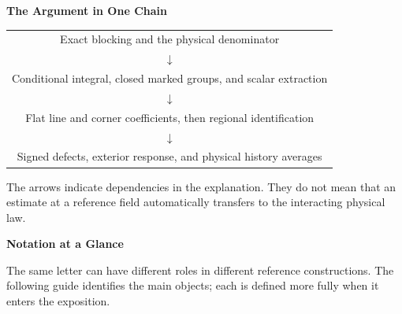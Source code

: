 \documentclass[11pt,a4paper]{article}
\newcommand{\subhead}[1]{\par\vspace{4pt}\textbf{\color{ink}#1}\par}
\begin{document}
\vspace{10pt}
\subhead{The Argument in One Chain}
\begin{center}
    \begin{tabular}{c}
        Exact blocking and the physical denominator\\
        $\downarrow$\\
        Conditional integral, closed marked groups, and scalar extraction\\
        $\downarrow$\\
        Flat line and corner coefficients, then regional identification\\
        $\downarrow$\\
        Signed defects, exterior response, and physical history averages
    \end{tabular}
\end{center}
The arrows indicate dependencies in the explanation. They do not mean that an estimate at a reference field automatically transfers to the interacting physical law.

\clearpage
{}
{\LARGE\bfseries\color{ink}Notation at a Glance\par}
\vspace{8pt}
The same letter can have different roles in different reference constructions. The following guide identifies the main objects; each is defined more fully when it enters the exposition.
\end{document}

